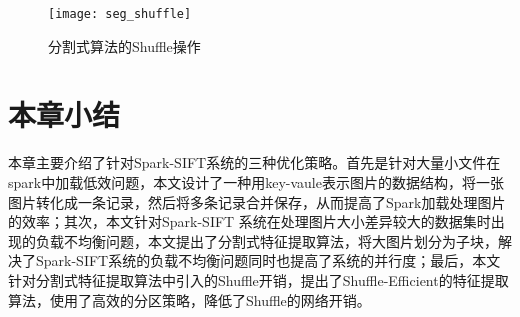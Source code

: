 \begin{figure}[htp]
\centering
\texttt{[image: seg\_shuffle]}
\caption{分割式算法的Shuffle操作}
\label{fig:seg_shuffle}
\end{figure}

\section{本章小结}
本章主要介绍了针对Spark-SIFT系统的三种优化策略。首先是针对大量小文件在spark中加载低效问题，本文设计了一种用key-vaule表示图片的数据结构，将一张图片转化成一条记录，然后将多条记录合并保存，从而提高了Spark加载处理图片的效率；其次，本文针对Spark-SIFT 系统在处理图片大小差异较大的数据集时出现的负载不均衡问题，本文提出了分割式特征提取算法，将大图片划分为子块，解决了Spark-SIFT系统的负载不均衡问题同时也提高了系统的并行度；最后，本文针对分割式特征提取算法中引入的Shuffle开销，提出了Shuffle-Efficient的特征提取算法，使用了高效的分区策略，降低了Shuffle的网络开销。

